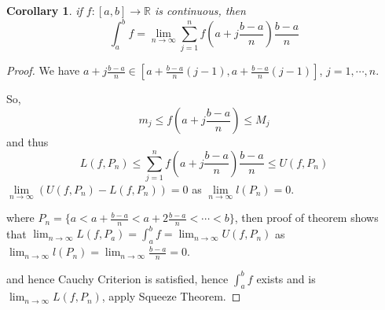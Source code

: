 \documentclass[12pt]{article}
\theoremstyle{plain}
\newtheorem{corollary}{Corollary}[subsection]
\newcommand{\dlim}{\displaystyle\lim\limits}
\begin{document}
	\begin{corollary}
		if $f:[a,b]\to\mathbb{R}$ is continuous, then 
		\[
			\int_a^b f 
			= \lim_{n\to\infty} \sum_{j=1}^n f(a+j\frac{b-a}n)\frac{b-a}n 
		\]
	\end{corollary}
	\begin{proof}
		We have $a+j\frac{b-a}n \in [a+\frac{b-a}n (j-1),a+\frac{b-a}n(j-1)]$,
		$j=1,\cdots, n$. 
		
		So, 
		\[
			m_j \leq f(a+j\frac{b-a}n) \leq M_j
		\]
		and thus 
		\[
			L(f,P_n) \leq \sum_{j=1}^nf(a+j\frac{b-a}n) \frac{b-a}n \leq 
			U(f,P_n) 
		\]
		$\dlim_{n\to\infty} (U(f,P_n) - L(f,P_n)) = 0$ as 
		$\dlim_{n\to\infty} l(P_n) = 0$. 
		
		where $P_n = \{a<a+\frac{b-a}n <a+2\frac{b-a}n <\cdots<b\}$, 
		then proof of theorem shows that $\lim_{n\to\infty} L(f,P_a)
		=\int^b_a f = \lim_{n\to\infty} U(f,P_n)$ as $\lim_{n\to\infty}
		l(P_n) = \lim_{n\to\infty} \frac{b-a}n = 0$. 
 
		and hence Cauchy Criterion is satisfied, hence
		$\int_a^b f$ exists and is $\lim_{n\to\infty} L(f,P_n)$, 
		apply Squeeze Theorem. 
	\end{proof}
\end{document}
